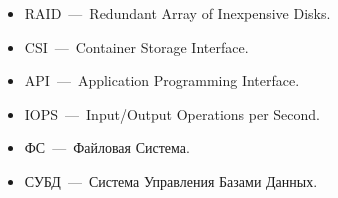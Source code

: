 \begin{abbreviations}
\begin{itemize}
	\item RAID~---~Redundant Array of Inexpensive Disks.
	\item CSI~---~Container Storage Interface.
	\item API~---~Application Programming Interface.
	\item IOPS~---~Input/Output Operations per Second.
	\item ФС~---~Файловая Система.
	\item СУБД~---~Система Управления Базами Данных.
\end{itemize}
\end{abbreviations}